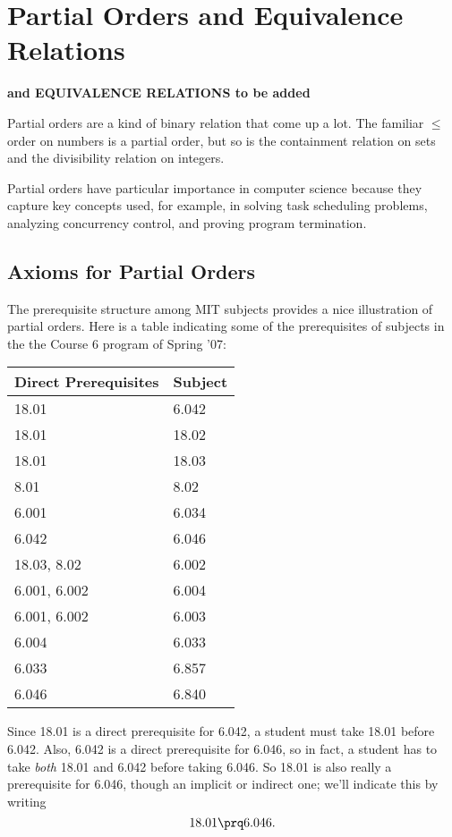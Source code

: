 \chapter{Partial Orders and Equivalence Relations}\label{partial_order_chap}

\begin{editingnotes}
\textbf{and EQUIVALENCE RELATIONS to be added}
\end{editingnotes}

Partial orders are a kind of binary relation that come up a lot.  The
familiar $\leq$ order on numbers is a partial order, but so is the
containment relation on sets and the divisibility relation on
integers.

Partial orders have particular importance in computer science because they
capture key concepts used, for example, in solving task scheduling
problems, analyzing concurrency control, and proving program termination.

\section{Axioms for Partial Orders}\label{prereq_sec}

The prerequisite structure among MIT subjects provides a nice illustration
of partial orders.  Here is a table indicating some of the prerequisites of
subjects in the the Course 6 program of Spring '07:
\begin{center}
\begin{tabular}{|l|l|}
\hline
Direct Prerequisites & Subject\\ \hline
18.01 & 6.042\\ \hline
 18.01 & 18.02\\ \hline
 18.01 & 18.03\\ \hline
 8.01 & 8.02\\ \hline
 6.001 & 6.034\\ \hline
 6.042 & 6.046\\ \hline
 18.03, 8.02 & 6.002\\ \hline
 6.001, 6.002 & 6.004\\ \hline
 6.001, 6.002 & 6.003\\ \hline
 6.004 & 6.033\\ \hline
 6.033 & 6.857\\ \hline
 6.046 & 6.840\\ \hline
\end{tabular}
\end{center}

Since 18.01 is a direct prerequisite for 6.042, a student must take 18.01
before 6.042.  Also, 6.042 is a direct prerequisite for 6.046, so in fact,
a student has to take \emph{both} 18.01 and 6.042 before taking 6.046.  So
18.01 is also really a prerequisite for 6.046, though an implicit or
indirect one; we'll indicate this by writing
\[
18.01 \prq 6.046.
\]

